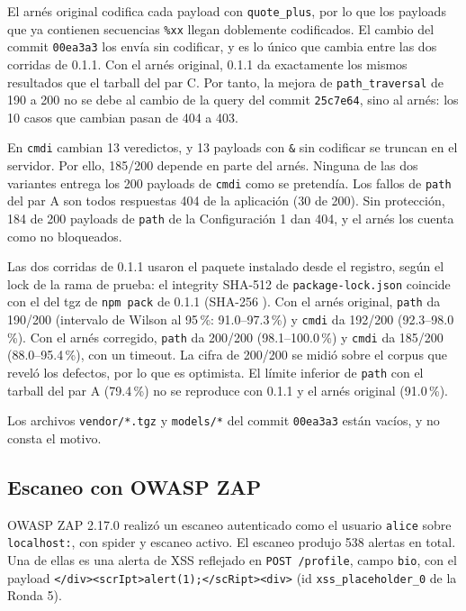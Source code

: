 El arnés original codifica cada payload con \texttt{quote\_plus}, por lo que los payloads que ya contienen secuencias \texttt{\%xx} llegan doblemente codificados. El cambio del commit \texttt{00ea3a3} los envía sin codificar, y es lo único que cambia entre las dos corridas de 0.1.1. Con el arnés original, 0.1.1 da exactamente los mismos resultados que el tarball del par C. Por tanto, la mejora de \texttt{path\_traversal} de 190 a 200 no se debe al cambio de la query del commit \texttt{25c7e64}, sino al arnés: los 10 casos que cambian pasan de 404 a 403.

En \texttt{cmdi} cambian 13 veredictos, y 13 payloads con \texttt{\&} sin codificar se truncan en el servidor. Por ello, 185/200 depende en parte del arnés. Ninguna de las dos variantes entrega los 200 payloads de \texttt{cmdi} como se pretendía. Los fallos de \texttt{path} del par A son todos respuestas 404 de la aplicación (30 de 200). Sin protección, 184 de 200 payloads de \texttt{path} de la Configuración 1 dan 404, y el arnés los cuenta como no bloqueados.

Las dos corridas de 0.1.1 usaron el paquete instalado desde el registro, según el lock de la rama de prueba: el integrity SHA-512 de \texttt{package-lock.json} coincide con el del tgz de \texttt{npm pack} de 0.1.1 (SHA-256 ). Con el arnés original, \texttt{path} da 190/200 (intervalo de Wilson al 95\,\%: 91.0--97.3\,\%) y \texttt{cmdi} da 192/200 (92.3--98.0\,\%). Con el arnés corregido, \texttt{path} da 200/200 (98.1--100.0\,\%) y \texttt{cmdi} da 185/200 (88.0--95.4\,\%), con un timeout. La cifra de 200/200 se midió sobre el corpus que reveló los defectos, por lo que es optimista. El límite inferior de \texttt{path} con el tarball del par A (79.4\,\%) no se reproduce con 0.1.1 y el arnés original (91.0\,\%).

Los archivos \texttt{vendor/*.tgz} y \texttt{models/*} del commit \texttt{00ea3a3} están vacíos, y no consta el motivo.

\subsection{Escaneo con OWASP ZAP}\label{anexo:coautor-zap}

OWASP ZAP 2.17.0 realizó un escaneo autenticado como el usuario \texttt{alice} sobre \texttt{localhost:}, con spider y escaneo activo. El escaneo produjo 538 alertas en total. Una de ellas es una alerta de XSS reflejado en \texttt{POST /profile}, campo \texttt{bio}, con el payload \texttt{</div>\allowbreak<scrIpt>\allowbreak alert(1);\allowbreak</scRipt>\allowbreak<div>} (id \texttt{xss\_placeholder\_0} de la Ronda 5).

